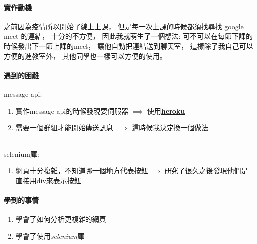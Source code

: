 \documentclass[12pt,oneside]{ctexart}
\begin{document}
\clearpage
\paragraph{ 實作動機 }
\begin{adjustwidth}{2em}{0em}
    之前因為疫情所以開始了線上上課，
    但是每一次上課的時候都須找尋找 google meet 的連結，
    十分的不方便，
    因此我就萌生了一個想法:
    可不可以在每節下課的時候發出下一節上課的meet，
    讓他自動把連結送到聊天室，
    這樣除了我自己可以方便的進教室外，
    其他同學也一樣可以方便的使用。
\end{adjustwidth}


\paragraph{遇到的困難}
\begin{adjustwidth}{2em}{0em}

message api:
\begin{adjustwidth}{2em}{0em}
\begin{enumerate}
    \item 
        實作message api的時候發現要伺服器 $\implies$ 使用\href{https://www.heroku.com/}{\textbf{heroku}}
    \item 
        需要一個群組才能開始傳送訊息 $\implies$ 這時候我決定換一個做法
\end{enumerate}
\end{adjustwidth}


\hspace*{\fill}\\
selenium庫: 

\begin{adjustwidth}{2em}{0em}
\begin{enumerate}
    \item
        網頁十分複雜，不知道哪一個地方代表按鈕$\implies$ 研究了很久之後發現他們是直接用div來表示按鈕
\end{enumerate}
\end{adjustwidth}

\end{adjustwidth}

\paragraph{ 學到的事情 }
\begin{adjustwidth}{2em}{0em}
\begin{enumerate}
    \item 
        學會了如何分析更複雜的網頁
    \item
        學會了使用\textit{selenium}庫
\end{enumerate}

    
\end{adjustwidth}
\clearpage
\end{document}
